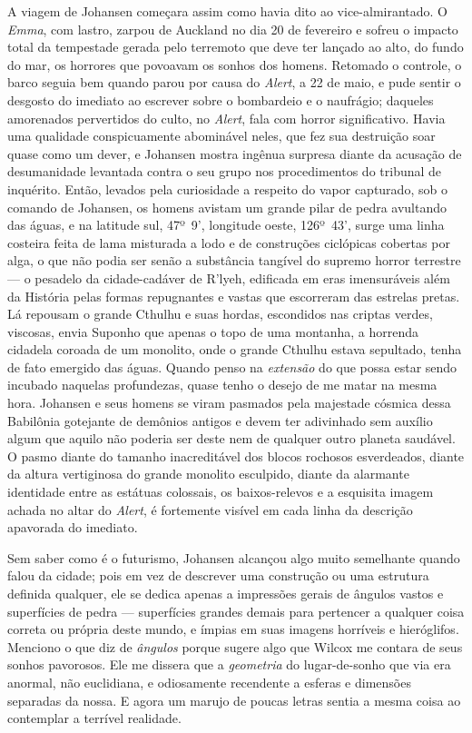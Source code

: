 A viagem de Johansen começara assim como havia dito ao vice-almirantado.
O \emph{Emma}, com lastro, zarpou de Auckland no dia 20 de fevereiro e
sofreu o impacto total da tempestade gerada pelo terremoto que deve ter
lançado ao alto, do fundo do mar, os horrores que povoavam os sonhos dos
homens. Retomado o controle, o barco seguia bem quando parou por causa
do \emph{Alert}, a 22 de maio, e pude sentir o desgosto do imediato ao
escrever sobre o bombardeio e o naufrágio; daqueles amorenados
pervertidos do culto, no \emph{Alert}, fala com horror significativo.
Havia uma qualidade conspicuamente abominável neles, que fez sua
destruição soar quase como um dever, e Johansen mostra ingênua surpresa
diante da acusação de desumanidade levantada contra o seu grupo nos
procedimentos do tribunal de inquérito. Então, levados pela curiosidade
a respeito do vapor capturado, sob o comando de Johansen, os homens
avistam um grande pilar de pedra avultando das águas, e na latitude sul,
47º~9', longitude oeste, 126º~43', surge uma linha costeira feita de
lama misturada a lodo e de construções ciclópicas cobertas por alga, o
que não podia ser senão a substância tangível do supremo horror
terrestre --- o pesadelo da cidade-cadáver de R'lyeh, edificada em eras
imensuráveis além da História pelas formas repugnantes e vastas que
escorreram das estrelas pretas. Lá repousam o grande Cthulhu e suas
hordas, escondidos nas criptas verdes, viscosas, envia
Suponho que apenas o topo de uma montanha, a horrenda cidadela coroada
de um monolito, onde o grande Cthulhu estava sepultado, tenha de fato
emergido das águas. Quando penso na \emph{extensão} do que possa estar
sendo incubado naquelas profundezas, quase tenho o desejo de me matar na
mesma hora. Johansen e seus homens se viram pasmados pela majestade
cósmica dessa Babilônia gotejante de demônios antigos e devem ter
adivinhado sem auxílio algum que aquilo não poderia ser deste nem de
qualquer outro planeta saudável. O pasmo diante do tamanho inacreditável
dos blocos rochosos esverdeados, diante da altura vertiginosa do grande
monolito esculpido, diante da alarmante identidade entre as estátuas
colossais, os baixos-relevos e a esquisita imagem achada no altar do
\emph{Alert}, é fortemente visível em cada linha da descrição apavorada
do imediato.

Sem saber como é o futurismo, Johansen alcançou algo muito semelhante
quando falou da cidade; pois em vez de descrever uma construção ou uma
estrutura definida qualquer, ele se dedica apenas a impressões gerais de
ângulos vastos e superfícies de pedra --- superfícies grandes demais
para pertencer a qualquer coisa correta ou própria deste mundo, e ímpias
em suas imagens horríveis e hieróglifos. Menciono o que diz de
\emph{ângulos} porque sugere algo que Wilcox me contara de seus sonhos
pavorosos. Ele me dissera que a \emph{geometria} do lugar-de-sonho que
via era anormal, não euclidiana, e odiosamente recendente a esferas e
dimensões separadas da nossa. E agora um marujo de poucas letras sentia
a mesma coisa ao contemplar a terrível realidade.

